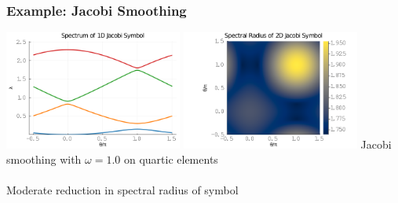 \documentclass{beamer}
\begin{document}

\begin{frame}
\begin{center}
\frametitle{Example: Jacobi Smoothing}

\includegraphics[height=3.9cm]{../img/JacobiSymbol1D}
\includegraphics[height=3.9cm]{../img/JacobiSymbol2D}
{\small Jacobi smoothing with $\omega = 1.0$ on quartic elements}\\

~\\

Moderate reduction in spectral radius of symbol

\end{center}
\end{frame}

\end{document}
